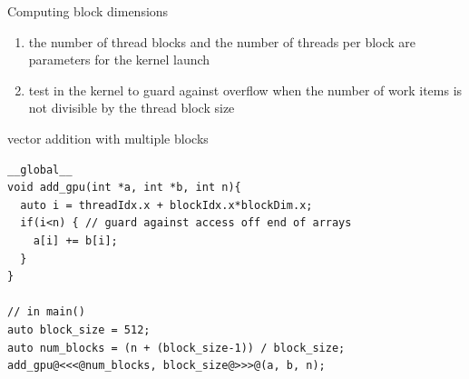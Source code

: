 \begin{frame}[fragile]{}
    \begin{info}{Computing block dimensions}
        \begin{enumerate}
            \item the number of thread blocks and the number of threads per block are parameters for the kernel launch
                \\ \centering {}
            \item test in the kernel to guard against overflow when the number of work items is not divisible by the thread block size
        \end{enumerate}
    \end{info}

    \begin{code}{vector addition with multiple blocks}
        \begin{lstlisting}[style=boxcudatiny]
__global__
void add_gpu(int *a, int *b, int n){
  auto i = threadIdx.x + blockIdx.x*blockDim.x;
  if(i<n) { // guard against access off end of arrays
    a[i] += b[i];
  }
}

// in main()
auto block_size = 512;
auto num_blocks = (n + (block_size-1)) / block_size;
add_gpu@<<<@num_blocks, block_size@>>>@(a, b, n);
        \end{lstlisting}
    \end{code}
\end{frame}

